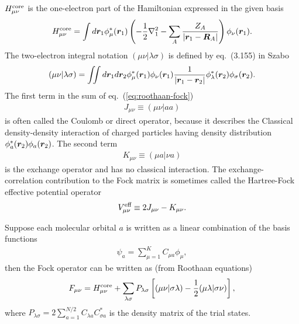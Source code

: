 $H^{\text{core}}_{\mu\nu}$ is the one-electron part of the Hamiltonian expressed in the given basis %
\begin{align} \label{eq:hf-hcore}
H^{\text{core}}_{\mu\nu} = \int d\boldsymbol{r}_1 \phi_\mu^*(\boldsymbol{r}_1)\left(
-\frac{1}{2}\nabla_1^2-\sum\limits_A \dfrac{Z_A}{\vert\boldsymbol{r}_1-\boldsymbol{R}_A\vert}
\right)  \phi_\nu(\boldsymbol{r}_1).
\end{align}
The two-electron integral notation $(\mu\nu|\lambda\sigma)$ is defined by eq.~(3.155) in Szabo
\begin{align} \label{eq:hf-eri}
(\mu\nu|\lambda\sigma) = \iint d\boldsymbol{r}_1 d\boldsymbol{r}_2 \phi_\mu^*(\boldsymbol{r}_1)\phi_{\nu}(\boldsymbol{r}_1)
\frac{1}{\vert\boldsymbol{r}_1-\boldsymbol{r}_2\vert}
\phi_\lambda^*(\boldsymbol{r}_2)\phi_\sigma(\boldsymbol{r}_2).
\end{align}
The first term in the sum of eq.~(\ref{eq:roothaan-fock})
\begin{align}
J_{\mu\nu} \equiv (\mu\nu|aa)
\end{align}
is often called the Coulomb or direct operator, because it describes the Classical density-density interaction of charged particles having density distribution $\phi_a^*(\boldsymbol{r}_2)\phi_a(\boldsymbol{r}_2)$. The second term
\begin{align}
K_{\mu\nu} \equiv (\mu a|\nu a)
\end{align}
is the exchange operator and has no classical interaction. The exchange-correlation contribution to the Fock matrix is sometimes called the Hartree-Fock effective potential operator
\begin{align}
V^{\text{eff}}_{\mu\nu}\equiv 2J_{\mu\nu} - K_{\mu\nu}.
\end{align}

Suppose each molecular orbital $a$ is written as a linear combination of the basis functions
\begin{align}
\psi_a = \sum\limits_{\mu=1}^K C_{\mu a} \phi_\mu,
\end{align}
then the Fock operator can be written as (from Roothaan equations)
\begin{align} \label{eq:roothaan-fock}
F_{\mu\nu} = H^{\text{core}}_{\mu\nu} + \sum\limits_{\lambda\sigma} P_{\lambda\sigma} \left[
(\mu\nu|\sigma\lambda) - \frac{1}{2}(\mu\lambda|\sigma\nu)
\right],
\end{align} %
where $P_{\lambda\sigma}=2\sum_{a=1}^{N/2} C_{\lambda a}C_{\sigma a}^*$ is the density matrix of the trial states. %

